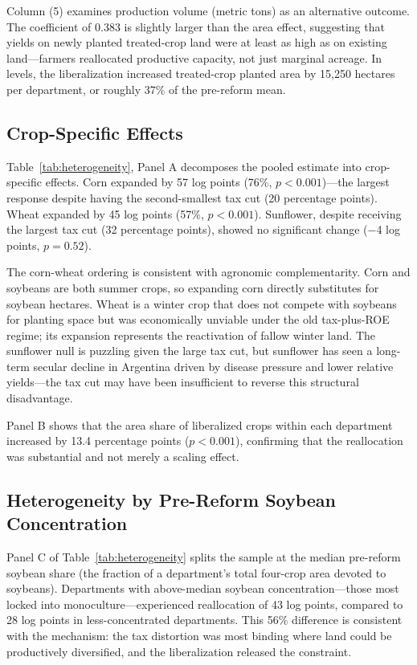 \documentclass[12pt]{article}
\begin{document}
Column (5) examines production volume (metric tons) as an alternative outcome. The coefficient of 0.383 is slightly larger than the area effect, suggesting that yields on newly planted treated-crop land were at least as high as on existing land---farmers reallocated productive capacity, not just marginal acreage. In levels, the liberalization increased treated-crop planted area by 15,250 hectares per department, or roughly 37\% of the pre-reform mean.

\subsection{Crop-Specific Effects}



Table~\ref{tab:heterogeneity}, Panel A decomposes the pooled estimate into crop-specific effects. Corn expanded by 57 log points (76\%, $p < 0.001$)---the largest response despite having the second-smallest tax cut (20 percentage points). Wheat expanded by 45 log points (57\%, $p < 0.001$). Sunflower, despite receiving the largest tax cut (32 percentage points), showed no significant change ($-$4 log points, $p = 0.52$).

The corn-wheat ordering is consistent with agronomic complementarity. Corn and soybeans are both summer crops, so expanding corn directly substitutes for soybean hectares. Wheat is a winter crop that does not compete with soybeans for planting space but was economically unviable under the old tax-plus-ROE regime; its expansion represents the reactivation of fallow winter land. The sunflower null is puzzling given the large tax cut, but sunflower has seen a long-term secular decline in Argentina driven by disease pressure and lower relative yields---the tax cut may have been insufficient to reverse this structural disadvantage.

Panel B shows that the area share of liberalized crops within each department increased by 13.4 percentage points ($p < 0.001$), confirming that the reallocation was substantial and not merely a scaling effect.

\subsection{Heterogeneity by Pre-Reform Soybean Concentration}

Panel C of Table~\ref{tab:heterogeneity} splits the sample at the median pre-reform soybean share (the fraction of a department's total four-crop area devoted to soybeans). Departments with above-median soybean concentration---those most locked into monoculture---experienced reallocation of 43 log points, compared to 28 log points in less-concentrated departments. This 56\% difference is consistent with the mechanism: the tax distortion was most binding where land could be productively diversified, and the liberalization released the constraint.
\end{document}
